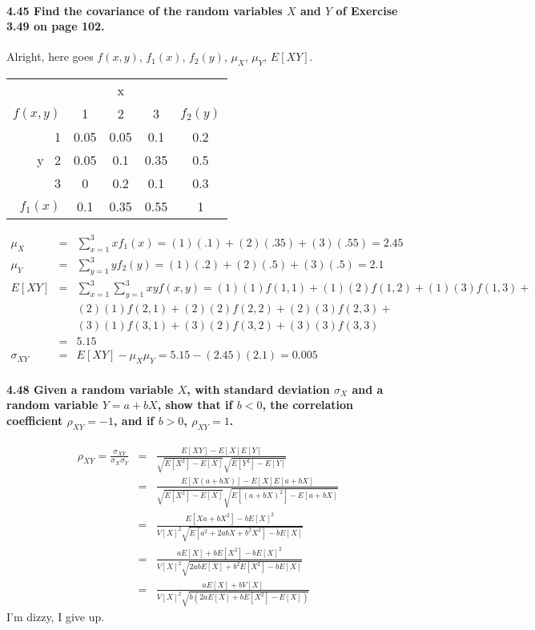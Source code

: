 \documentclass{article}
\begin{document}
\paragraph{4.45 Find the covariance of the random variables $X$ and $Y$ of 
Exercise 3.49 on page 102.\\}
Alright, here goes $f(x,y)$, $f_1(x)$, $f_2(y)$, $\mu_X$, $\mu_Y$, $E[XY]$.
\begin{center}
\begin{tabular}{r|c c c|c}
           &      &  x   &      &\\
$f(x,y)$   &  1   &  2   &  3   & $f_2(y)$\\
\hline
         1 & 0.05 & 0.05 & 0.1  & 0.2\\
y$\;\;\;$2 & 0.05 & 0.1  & 0.35 & 0.5\\
         3 & 0    & 0.2  & 0.1  & 0.3\\
\hline
$f_1(x)$   & 0.1  & 0.35 & 0.55 & 1
\end{tabular}
\end{center}
\begin{eqnarray*}
\mu_X & = & \sum_{x=1}^3 xf_1(x) = (1)(.1) + (2)(.35) + (3)(.55) = 2.45\\
\mu_Y & = & \sum_{y=1}^3 yf_2(y) = (1)(.2) + (2)(.5) + (3)(.5) = 2.1\\
E[XY] & = & \sum_{x=1}^3\sum_{y=1}^3 xyf(x,y) = (1)(1)f(1,1) + (1)(2)f(1,2)+
				(1)(3)f(1,3) +\\
				& & (2)(1)f(2,1) + (2)(2)f(2,2) + (2)(3)f(2,3) +\\
				& & (3)(1)f(3,1) + (3)(2)f(3,2) + (3)(3)f(3,3)\\
				& = & 5.15\\
\sigma_{XY} & = & E[XY] - \mu_X\mu_Y = 5.15-(2.45)(2.1) = \boxed{0.005}
\end{eqnarray*}

\paragraph{4.48 Given a random variable $X$, with standard deviation $\sigma_X$ 
and a random variable $Y = a+bX$, show that if $b<0$, the correlation 
coefficient $\rho_{XY} = -1$, and if $b>0$, $\rho_{XY} = 1$.}
\begin{eqnarray*}
\rho_{XY} = \frac{\sigma_{XY}}{\sigma_X\sigma_Y} & = & 
	\frac{E[XY]-E[X]E[Y]}{\sqrt{E[X^2]-E[X]}\sqrt{E[Y^2]-E[Y]}}\\
	& = & \frac{E[X(a+bX)]-E[X]E[a+bX]}{\sqrt{E[X^2]-E[X]}
					\sqrt{E[(a+bX)^2]-E[a+bX]}}\\
	& = & \frac{E[Xa+bX^2]-bE[X]^2}{V[X]^2\sqrt{E[a^2+2abX+b^2X^2]-bE[X]}}\\
	& = & \frac{aE[X]+bE[X^2]-bE[X]^2}{V[X]^2\sqrt{2abE[X]+b^2E[X^2]-bE[X]}}\\
	& = & \frac{aE[X]+bV[X]}{V[X]^2\sqrt{b(2aE[X]+bE[X^2]-E[X])}}
\end{eqnarray*}
I'm dizzy, I give up.
\end{document}
